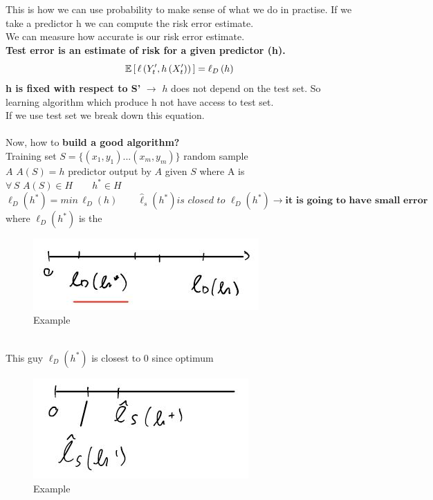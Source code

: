 \documentclass[../main.tex]{subfiles}
\begin{document}
This is how we can use probability to make sense of what we do in practise.
If we take a predictor h we can compute the risk error estimate.\\
We can measure how accurate is our risk error estimate.\\
\textbf{Test error is an estimate of risk for a given predictor (h).}
\\ 
$$
\mathbb{E} \left[ \, \ell\left( Y'_t, h\left(X'_t\right)\right) \, \right] = \ell_D \left( h\right) 
$$
\textbf{h is fixed with respect to S’} $\longrightarrow$ $h$ does not depend on the test set.
So learning algorithm which produce h not have access to test set.\\
If we use test set we break down this equation.
\\\\
Now, how to \textbf{build a good algorithm?}\\
Training set $S = \{ \left(x_1,y_1\right)...\left(x_m,y_m\right) \}$ random sample
\\$ A $ \qquad $A\left(S\right) = h $ predictor output by $A$ given $S$
where A is 
\\
$\forall \, S$ \qquad $A\left(S\right) \in H \qquad h^* \in H $
\\
$$
\ell_D\left(h^*\right) = min \, \ell_D \left(h\right) \qquad \hat{\ell}_s\left(h^*\right) \textit{is closed to } \ell_D\left(h^*\right) \longrightarrow \textbf{it is going to have small error }
$$
where $\ell_D\left(h^*\right)$ is the 
\begin{figure}[h]
    \centering
    \includegraphics[width=0.3\linewidth]{../img/lez7-img4.JPG}
    \caption{Example}
\end{figure}\\
This guy $\ell_D\left(h^*\right)$ is closest to $0$ since optimum\\
\begin{figure}[h]
    \centering
    \includegraphics[width=0.3\linewidth]{../img/lez7-img5.JPG}
    \caption{Example}
\end{figure}\\
\end{document}
